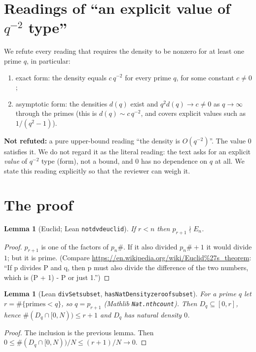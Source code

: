 \documentclass[11pt]{article}
\renewcommand{\_}{\oldus\allowbreak}
\newtheorem{lemma}[theorem]{Lemma}
\theoremstyle{definition}
\theoremstyle{remark}
\begin{document}
\section{Readings of ``an explicit value of $q^{-2}$ type''}

We refute every reading that requires the density to be nonzero for at least one prime $q$, in particular:
\begin{enumerate}[label=(\roman*),nosep]
\item exact form: the density equals $c\,q^{-2}$ for every prime $q$, for some constant $c \neq 0$;
\item asymptotic form: the densities $d(q)$ exist and $q^2 d(q) \to c \neq 0$ as $q \to \infty$ through the
  primes (this is $d(q) \sim c\,q^{-2}$, and covers explicit values such as $1/(q^2-1)$).
\end{enumerate}
\textbf{Not refuted:} a pure upper-bound reading ``the density is $O(q^{-2})$''. The value $0$ satisfies it.
We do not regard it as the literal reading: the text asks for an explicit \emph{value} of $q^{-2}$ type
(form), not a bound, and $0$ has no dependence on $q$ at all. We state this reading explicitly so that the
reviewer can weigh it.

\section{The proof}

\begin{lemma}[Euclid; Lean \texttt{not\_dvd\_euclid}]
If $r < n$ then $p_{r+1} \nmid E_n$.
\end{lemma}
\begin{proof}
$p_{r+1}$ is one of the factors of $p_n\#$. If it also divided $p_n\# + 1$ it would divide $1$; but it is
prime. (Compare \url{https://en.wikipedia.org/wiki/Euclid%27s_theorem}: ``If p divides P and q, then p must
also divide the difference of the two numbers, which is (P + 1) - P or just 1.'')
\end{proof}

\begin{lemma}[Lean \texttt{divSet\_subset}, \texttt{hasNatDensity\_zero\_of\_subset}]
For a prime $q$ let $r = \#\{\text{primes} < q\}$, so $q = p_{r+1}$ (Mathlib \texttt{Nat.nth\_count}). Then
$D_q \subseteq [0, r]$, hence $\#(D_q \cap [0,N)) \le r+1$ and $D_q$ has natural density $0$.
\end{lemma}
\begin{proof}
The inclusion is the previous lemma. Then $0 \le \#(D_q \cap [0,N))/N \le (r+1)/N \to 0$.
\end{proof}
\end{document}

